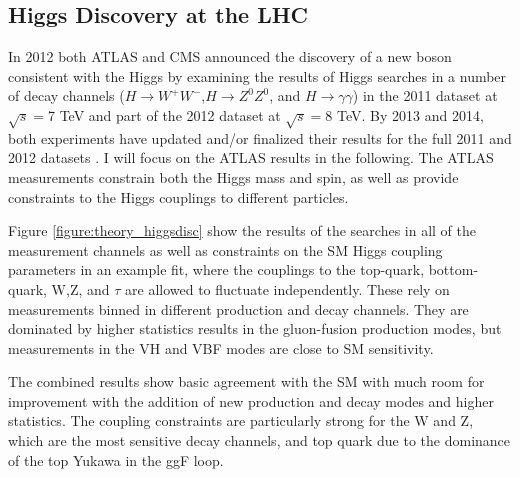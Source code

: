 \subsection{Higgs Discovery at the LHC}

In 2012 both ATLAS and CMS announced the discovery of a new boson consistent
with the Higgs by examining the results of Higgs searches in a number of decay
channels ($H\rightarrow W^+W^-$,$H\rightarrow Z^0Z^0$, and
    $H\rightarrow\gamma\gamma$) in the 2011 dataset at $\sqrt{s}=$7 TeV and
part of the 2012 dataset at $\sqrt{s}=$8 TeV. By 2013 and 2014, both
experiments have updated and/or finalized their results for the full 2011 and
2012 datasets \cite{ATLAS-CONF-2014-009,CMS-PAS-HIG-14-009}. I will focus on the ATLAS results in the following. The
ATLAS measurements constrain both the Higgs mass\cite{Aad:2014aba} and spin\cite{tagkey2013120}, as well as 
provide constraints to the Higgs couplings to different particles. 

Figure \ref{figure:theory_higgsdisc} show the results of the searches in all of the
measurement channels as well as constraints on the SM Higgs coupling parameters in 
an example fit, where the couplings to the top-quark, bottom-quark, W,Z, and $\tau$
are allowed to fluctuate independently. These rely on measurements binned in different
production and decay channels. They are dominated by higher statistics results in the 
gluon-fusion production modes, but measurements in the VH and VBF modes are close to 
SM sensitivity. 

The combined results show basic agreement with the SM with much room for improvement
with the addition of new production and decay modes and higher statistics. The 
coupling constraints are particularly strong for the W and Z, which are
the most sensitive decay channels, and top quark due to the dominance of the
top Yukawa in the ggF loop. 


